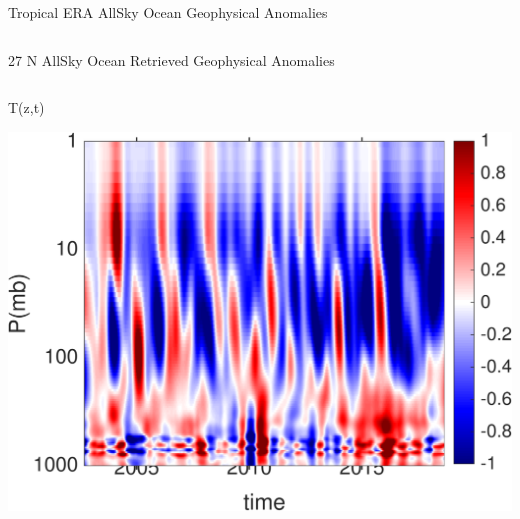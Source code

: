 \documentclass[10pt,t]{beamer}
\begin{document}
\begin{frame}{Tropical ERA AllSky Ocean Geophysical Anomalies}
\begin{columns}
\begin{column}{0.45\columnwidth}

\end{column}
\end{columns}
\end{frame}


\begin{frame}{27 N AllSky Ocean Retrieved Geophysical Anomalies}
\vspace{-0.35in}

\begin{columns}
\begin{column}{0.45\columnwidth}
\begin{block}{\footnotesize T(z,t)}
\vspace{-0.1in}
\begin{center}
\includegraphics[width=\linewidth]{Figs/CloudAnom/Desc_ocean/ntropic27N_umbc_cld_retr_obs_ptemp_anom_200209_201808.png}
\end{center}
\end{block}
\end{column}


\end{columns}
\end{frame}
\end{document}
